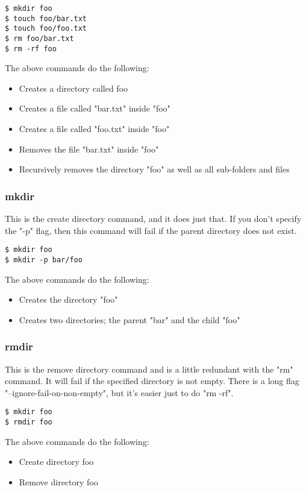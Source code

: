 \begin{lstlisting}
$ mkdir foo
$ touch foo/bar.txt
$ touch foo/foo.txt
$ rm foo/bar.txt
$ rm -rf foo
\end{lstlisting}

The above commands do the following:
	\begin{itemize}
		\item Creates a directory called foo
		\item Creates a file called "bar.txt" inside "foo"
		\item Creates a file called "foo.txt" inside "foo"
		\item Removes the file "bar.txt" inside "foo"
		\item Recursively removes the directory "foo" as well as all sub-folders and files
	\end{itemize}


\subsubsection{mkdir} \mdseries
This is the create directory command, and it does just that.  If you don't specify the "-p" flag, then this command will fail if the parent directory does not exist.

\begin{lstlisting}
$ mkdir foo
$ mkdir -p bar/foo
\end{lstlisting}

The above commands do the following:
	\begin{itemize}
		\item Creates the directory "foo"
		\item Creates two directories; the parent "bar" and the child "foo"
	\end{itemize}


\subsubsection{rmdir} \mdseries
This is the remove directory command and is a little redundant with the "rm" command.  It will fail if the specified directory is not empty.  There is a long flag "--ignore-fail-on-non-empty", but it's easier just to do "rm -rf".

\begin{lstlisting}
$ mkdir foo
$ rmdir foo
\end{lstlisting}

The above commands do the following:
	\begin{itemize}
		\item Create directory foo
		\item Remove directory foo
	\end{itemize}

